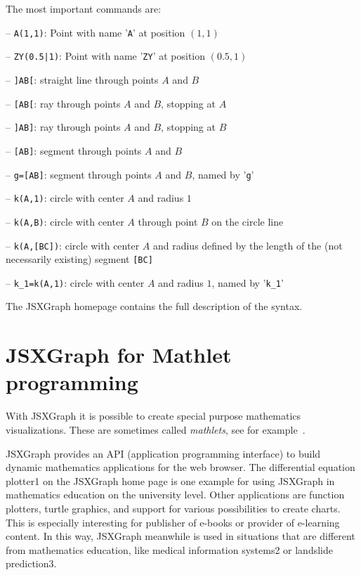 \documentclass[12pt,a4paper]{article}%
\begin{document}
The most important commands are:
\begin{description}
\item{-- \verb+A(1,1)+:} Point with name '\verb|A|' at position $(1,1)$
\item{-- \verb+ZY(0.5|1)+:} Point with name '\verb|ZY|' at position $(0.5,1)$
\item{-- \verb|]AB[|:} straight line through points $A$ and $B$
\item{-- \verb|[AB[|:} ray through points $A$ and $B$, stopping at $A$
\item{-- \verb|]AB]|:} ray through points $A$ and $B$, stopping at $B$
\item{-- \verb|[AB]|:} segment through points $A$ and $B$
\item{-- \verb|g=[AB]|:} segment through points $A$ and $B$, named by '\verb|g|'
\item{-- \verb|k(A,1)|:} circle with center $A$ and radius $1$
\item{-- \verb|k(A,B)|:} circle with center $A$ through point $B$ on the circle line
\item{-- \verb|k(A,[BC])|:} circle with center $A$ and radius defined by the length of the 
(not necessarily existing) segment \verb|[BC]|
\item{-- \verb|k_1=k(A,1)|:} circle with center $A$ and radius $1$, named by '\verb|k_1|' 
\end{description}

The JSXGraph homepage contains the full description of the syntax.


\section{JSXGraph for Mathlet programming}
With JSXGraph it is possible to create special purpose mathematics visualizations.
These are sometimes called {\sl mathlets}, see for example~\cite{mitmathlets}.

JSXGraph provides an API (application programming interface) to build dynamic 
mathematics applications for the web browser. The differential equation plotter1 
on the JSXGraph home page is one example for using JSXGraph in mathematics 
education on the university level. Other applications are function plotters, 
turtle graphics, and support for various possibilities to create charts. 
This is especially interesting for publisher of e-books or provider of e-learning 
content. In this way, JSXGraph meanwhile is used in situations that are different 
from mathematics education, like medical information systems2 or landslide prediction3. 
\end{document}
